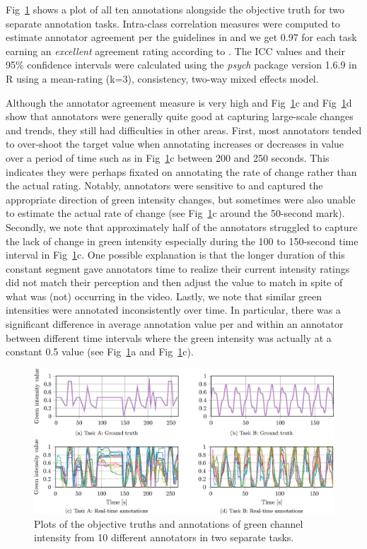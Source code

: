 \documentclass[10pt,letterpaper]{article}
\begin{document}
Fig~\ref{Fig:2} shows a plot of all ten annotations alongside the objective truth for two separate annotation tasks.  Intra-class correlation measures were computed to estimate annotator agreement per the guidelines in \cite{koo2016guideline} and we get 0.97 for each task earning an \textit{excellent} agreement rating according to \cite{cicchetti1994guidelines}.  The ICC values and their 95\% confidence intervals were calculated using the \textit{psych} package version 1.6.9 in R using a mean-rating (k=3), consistency, two-way mixed effects model.

Although the annotator agreement measure is very high and Fig~\ref{Fig:2}c and Fig~\ref{Fig:2}d show that annotators were generally quite good at capturing large-scale changes and trends, they still had difficulties in other areas.  First, most annotators tended to over-shoot the target value when annotating increases or decreases in value over a period of time such as in Fig~\ref{Fig:2}c between 200 and 250 seconds.  This indicates they were perhaps fixated on annotating the rate of change rather than the actual rating.  Notably, annotators were sensitive to and captured the appropriate direction of green intensity changes, but sometimes were also unable to estimate the actual rate of change (see Fig~\ref{Fig:2}c around the 50-second mark).  Secondly, we note that approximately half of the annotators struggled to capture the lack of change in green intensity especially during the 100 to 150-second time interval in Fig~\ref{Fig:2}c.  One possible explanation is that the longer duration of this constant segment gave annotators time to realize their current intensity ratings did not match their perception and then adjust the value to match in spite of what was (not) occurring in the video.  Lastly, we note that similar green intensities were annotated inconsistently over time.  In particular, there was a significant difference in average annotation value per and within an annotator between different time intervals where the green intensity was actually at a constant 0.5 value (see Fig~\ref{Fig:2}a and Fig~\ref{Fig:2}c).

\begin{figure}[t]
    \begin{adjustwidth}{-2.25in}{0in}
	\centering
    \includegraphics{images/Fig2.eps}
    \vspace{0.2cm}
	\caption{Plots of the objective truths and annotations of green channel intensity from 10 different annotators in two separate tasks.}
	\label{Fig:2}
	\end{adjustwidth}
\end{figure}
\end{document}
